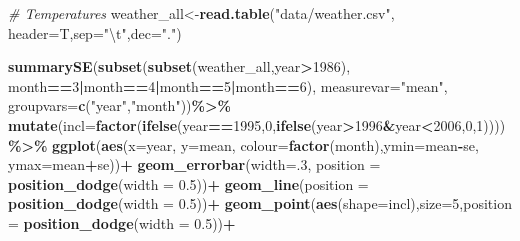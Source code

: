 \documentclass[
]{article}
\newenvironment{Shaded}{\begin{snugshade}}{\end{snugshade}}
\newcommand{\CharTok}[1]{\textcolor[rgb]{0.31,0.60,0.02}{#1}}
\newcommand{\CommentTok}[1]{\textcolor[rgb]{0.56,0.35,0.01}{\textit{#1}}}
\newcommand{\DataTypeTok}[1]{\textcolor[rgb]{0.13,0.29,0.53}{#1}}
\newcommand{\DecValTok}[1]{\textcolor[rgb]{0.00,0.00,0.81}{#1}}
\newcommand{\FloatTok}[1]{\textcolor[rgb]{0.00,0.00,0.81}{#1}}
\newcommand{\KeywordTok}[1]{\textcolor[rgb]{0.13,0.29,0.53}{\textbf{#1}}}
\newcommand{\NormalTok}[1]{#1}
\newcommand{\OperatorTok}[1]{\textcolor[rgb]{0.81,0.36,0.00}{\textbf{#1}}}
\newcommand{\StringTok}[1]{\textcolor[rgb]{0.31,0.60,0.02}{#1}}
\begin{document}
\begin{Shaded}
\begin{Highlighting}[]
\CommentTok{\# Temperatures}
\NormalTok{weather\_all\textless{}{-}}\KeywordTok{read.table}\NormalTok{(}\StringTok{"data/weather.csv"}\NormalTok{,}
                    \DataTypeTok{header=}\NormalTok{T,}\DataTypeTok{sep=}\StringTok{"}\CharTok{\textbackslash{}t}\StringTok{"}\NormalTok{,}\DataTypeTok{dec=}\StringTok{"."}\NormalTok{) }

\KeywordTok{summarySE}\NormalTok{(}\KeywordTok{subset}\NormalTok{(}\KeywordTok{subset}\NormalTok{(weather\_all,year}\OperatorTok{\textgreater{}}\DecValTok{1986}\NormalTok{),}
\NormalTok{                 month}\OperatorTok{==}\DecValTok{3}\OperatorTok{|}\NormalTok{month}\OperatorTok{==}\DecValTok{4}\OperatorTok{|}\NormalTok{month}\OperatorTok{==}\DecValTok{5}\OperatorTok{|}\NormalTok{month}\OperatorTok{==}\DecValTok{6}\NormalTok{), }
          \DataTypeTok{measurevar=}\StringTok{"mean"}\NormalTok{, }\DataTypeTok{groupvars=}\KeywordTok{c}\NormalTok{(}\StringTok{"year"}\NormalTok{,}\StringTok{"month"}\NormalTok{))}\OperatorTok{\%\textgreater{}\%}
\StringTok{  }\KeywordTok{mutate}\NormalTok{(}\DataTypeTok{incl=}\KeywordTok{factor}\NormalTok{(}\KeywordTok{ifelse}\NormalTok{(year}\OperatorTok{==}\DecValTok{1995}\NormalTok{,}\DecValTok{0}\NormalTok{,}\KeywordTok{ifelse}\NormalTok{(year}\OperatorTok{\textgreater{}}\DecValTok{1996}\OperatorTok{\&}\NormalTok{year}\OperatorTok{\textless{}}\DecValTok{2006}\NormalTok{,}\DecValTok{0}\NormalTok{,}\DecValTok{1}\NormalTok{))))}\OperatorTok{\%\textgreater{}\%}
\KeywordTok{ggplot}\NormalTok{(}\KeywordTok{aes}\NormalTok{(}\DataTypeTok{x=}\NormalTok{year, }\DataTypeTok{y=}\NormalTok{mean, }\DataTypeTok{colour=}\KeywordTok{factor}\NormalTok{(month),}\DataTypeTok{ymin=}\NormalTok{mean}\OperatorTok{{-}}\NormalTok{se, }\DataTypeTok{ymax=}\NormalTok{mean}\OperatorTok{+}\NormalTok{se))}\OperatorTok{+}
\StringTok{  }\KeywordTok{geom\_errorbar}\NormalTok{(}\DataTypeTok{width=}\NormalTok{.}\DecValTok{3}\NormalTok{, }\DataTypeTok{position =} \KeywordTok{position\_dodge}\NormalTok{(}\DataTypeTok{width =} \FloatTok{0.5}\NormalTok{))}\OperatorTok{+}
\StringTok{  }\KeywordTok{geom\_line}\NormalTok{(}\DataTypeTok{position =} \KeywordTok{position\_dodge}\NormalTok{(}\DataTypeTok{width =} \FloatTok{0.5}\NormalTok{))}\OperatorTok{+}
\StringTok{  }\KeywordTok{geom\_point}\NormalTok{(}\KeywordTok{aes}\NormalTok{(}\DataTypeTok{shape=}\NormalTok{incl),}\DataTypeTok{size=}\DecValTok{5}\NormalTok{,}\DataTypeTok{position =} \KeywordTok{position\_dodge}\NormalTok{(}\DataTypeTok{width =} \FloatTok{0.5}\NormalTok{))}\OperatorTok{+}

\end{Highlighting}
\end{Shaded}
\end{document}
